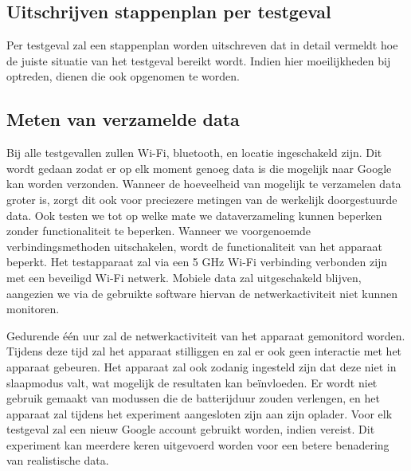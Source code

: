 \subsection{Uitschrijven stappenplan per testgeval}
Per testgeval zal een stappenplan worden uitschreven dat in detail vermeldt hoe de juiste situatie van het testgeval bereikt wordt. Indien hier moeilijkheden bij optreden, dienen die ook opgenomen te worden.

\subsection{Meten van verzamelde data}
Bij alle testgevallen zullen Wi-Fi, bluetooth, en locatie ingeschakeld zijn. Dit wordt gedaan zodat er op elk moment genoeg data is die mogelijk naar Google kan worden verzonden. Wanneer de hoeveelheid van mogelijk te verzamelen data groter is, zorgt dit ook voor preciezere metingen van de werkelijk doorgestuurde data. Ook  testen we tot op welke mate we dataverzameling kunnen beperken zonder functionaliteit te beperken. Wanneer we voorgenoemde verbindingsmethoden uitschakelen, wordt de functionaliteit van het apparaat beperkt. Het testapparaat zal via een 5 GHz Wi-Fi verbinding verbonden zijn met een beveiligd Wi-Fi netwerk. Mobiele data zal uitgeschakeld blijven, aangezien we via de gebruikte software hiervan de netwerkactiviteit niet kunnen monitoren.

Gedurende één uur zal de netwerkactiviteit van het apparaat gemonitord worden. Tijdens deze tijd zal het apparaat stilliggen en zal er ook geen interactie met het apparaat gebeuren. Het apparaat zal ook zodanig ingesteld zijn dat deze niet in slaapmodus valt, wat mogelijk de resultaten kan beïnvloeden. Er wordt niet gebruik gemaakt van modussen die de batterijduur zouden verlengen, en het apparaat zal tijdens het experiment aangesloten zijn aan zijn oplader. Voor elk testgeval zal een nieuw Google account gebruikt worden, indien vereist. Dit experiment kan meerdere keren uitgevoerd worden voor een betere benadering van realistische data.




